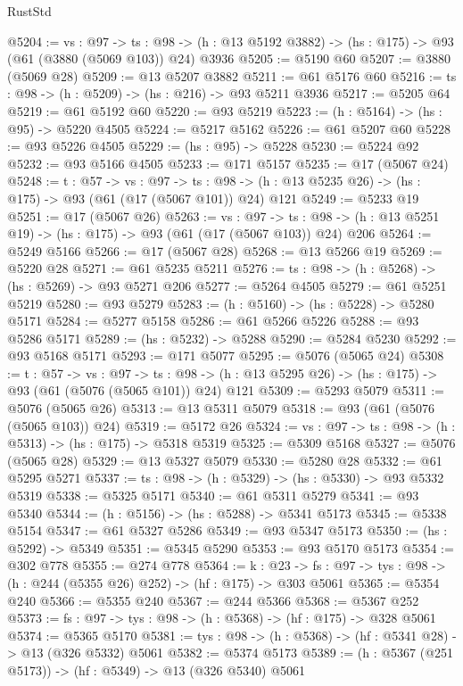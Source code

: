 \begin{lexlean}{RustStd}
\begin{coremodule}
@5204 := {vs : @97} ->
  {ts : @98} -> (h : @13 @5192 @3882) -> (hs : @175) -> @93 (@61 (@3880 (@5069 @103)) @24) @3936
@5205 := @5190 @60
@5207 := @3880 (@5069 @28)
@5209 := @13 @5207 @3882
@5211 := @61 @5176 @60
@5216 := {ts : @98} -> (h : @5209) -> (hs : @216) -> @93 @5211 @3936
@5217 := @5205 @64
@5219 := @61 @5192 @60
@5220 := @93 @5219
@5223 := (h : @5164) -> (hs : @95) -> @5220 @4505
@5224 := @5217 @5162
@5226 := @61 @5207 @60
@5228 := @93 @5226 @4505
@5229 := (hs : @95) -> @5228
@5230 := @5224 @92
@5232 := @93 @5166 @4505
@5233 := @171 @5157
@5235 := @17 (@5067 @24)
@5248 := {t : @57} ->
  {vs : @97} ->
  {ts : @98} -> (h : @13 @5235 @26) -> (hs : @175) -> @93 (@61 (@17 (@5067 @101)) @24) @121
@5249 := @5233 @19
@5251 := @17 (@5067 @26)
@5263 := {vs : @97} ->
  {ts : @98} -> (h : @13 @5251 @19) -> (hs : @175) -> @93 (@61 (@17 (@5067 @103)) @24) @206
@5264 := @5249 @5166
@5266 := @17 (@5067 @28)
@5268 := @13 @5266 @19
@5269 := @5220 @28
@5271 := @61 @5235 @5211
@5276 := {ts : @98} -> (h : @5268) -> (hs : @5269) -> @93 @5271 @206
@5277 := @5264 @4505
@5279 := @61 @5251 @5219
@5280 := @93 @5279
@5283 := (h : @5160) -> (hs : @5228) -> @5280 @5171
@5284 := @5277 @5158
@5286 := @61 @5266 @5226
@5288 := @93 @5286 @5171
@5289 := (hs : @5232) -> @5288
@5290 := @5284 @5230
@5292 := @93 @5168 @5171
@5293 := @171 @5077
@5295 := @5076 (@5065 @24)
@5308 := {t : @57} ->
  {vs : @97} ->
  {ts : @98} -> (h : @13 @5295 @26) -> (hs : @175) -> @93 (@61 (@5076 (@5065 @101)) @24) @121
@5309 := @5293 @5079
@5311 := @5076 (@5065 @26)
@5313 := @13 @5311 @5079
@5318 := @93 (@61 (@5076 (@5065 @103)) @24)
@5319 := @5172 @26
@5324 := {vs : @97} -> {ts : @98} -> (h : @5313) -> (hs : @175) -> @5318 @5319
@5325 := @5309 @5168
@5327 := @5076 (@5065 @28)
@5329 := @13 @5327 @5079
@5330 := @5280 @28
@5332 := @61 @5295 @5271
@5337 := {ts : @98} -> (h : @5329) -> (hs : @5330) -> @93 @5332 @5319
@5338 := @5325 @5171
@5340 := @61 @5311 @5279
@5341 := @93 @5340
@5344 := (h : @5156) -> (hs : @5288) -> @5341 @5173
@5345 := @5338 @5154
@5347 := @61 @5327 @5286
@5349 := @93 @5347 @5173
@5350 := (hs : @5292) -> @5349
@5351 := @5345 @5290
@5353 := @93 @5170 @5173
@5354 := @302 @778
@5355 := @274 @778
@5364 := {k : @23} ->
  {fs : @97} -> {tys : @98} -> (h : @244 (@5355 @26) @252) -> (hf : @175) -> @303 @5061
@5365 := @5354 @240
@5366 := @5355 @240
@5367 := @244 @5366
@5368 := @5367 @252
@5373 := {fs : @97} -> {tys : @98} -> (h : @5368) -> (hf : @175) -> @328 @5061
@5374 := @5365 @5170
@5381 := {tys : @98} -> (h : @5368) -> (hf : @5341 @28) -> @13 (@326 @5332) @5061
@5382 := @5374 @5173
@5389 := (h : @5367 (@251 @5173)) -> (hf : @5349) -> @13 (@326 @5340) @5061

\end{coremodule}
\end{lexlean}
